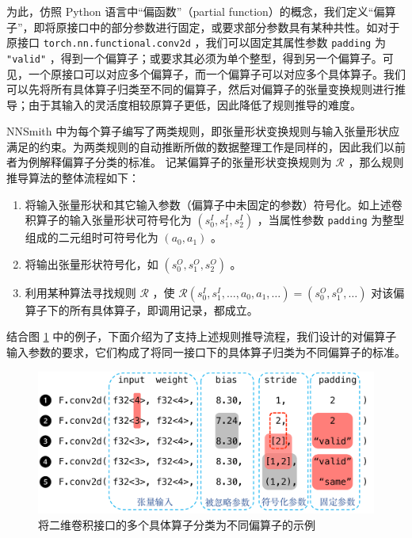 为此，仿照 Python 语言中“偏函数”（partial function）\cite{python_partial}的概念，我们定义“偏算子”，即将原接口中的部分参数进行固定，或要求部分参数具有某种共性。如对于原接口 \texttt{torch.nn.functional.conv2d} ，我们可以固定其属性参数 \texttt{padding} 为 \texttt{"valid"} ，得到一个偏算子；或要求其必须为单个整型，得到另一个偏算子。可见，一个原接口可以对应多个偏算子，而一个偏算子可以对应多个具体算子。我们可以先将所有具体算子归类至不同的偏算子，然后对偏算子的张量变换规则进行推导；由于其输入的灵活度相较原算子更低，因此降低了规则推导的难度。

NNSmith 中为每个算子编写了两类规则，即张量形状变换规则与输入张量形状应满足的约束。为两类规则的自动推断所做的数据整理工作是同样的，因此我们以前者为例解释偏算子分类的标准。
记某偏算子的张量形状变换规则为 $\mathcal{R}$ ，那么规则推导算法的整体流程如下：
\begin{enumerate}
    \item 将输入张量形状和其它输入参数（偏算子中未固定的参数）符号化。如上述卷积算子的输入张量形状可符号化为 $(s^I_0, s^I_1, s^I_2)$ ，当属性参数 \texttt{padding} 为整型组成的二元组时可符号化为 $(a_0, a_1)$ 。
    \item 将输出张量形状符号化，如 $(s^O_0, s^O_1, s^O_2)$ 。
    \item 利用某种算法寻找规则 $\mathcal{R}$ ，使 $\mathcal{R}(s^I_0, s^I_1, \dots, a_0, a_1, \dots) = (s^O_0, s^O_1, \dots)$ 对该偏算子下的所有具体算子，即调用记录，都成立。
\end{enumerate}

结合图 \ref{fig:conv2d} 中的例子，下面介绍为了支持上述规则推导流程，我们设计的对偏算子输入参数的要求，它们构成了将同一接口下的具体算子归类为不同偏算子的标准。

\begin{figure}
    \centering
    \includegraphics[width=1.\linewidth]{figures/conv2d.pdf}
    \caption{将二维卷积接口的多个具体算子分类为不同偏算子的示例}
    \label{fig:conv2d}
\end{figure}

